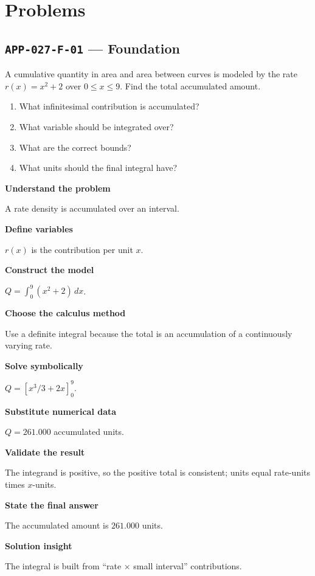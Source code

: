 \documentclass[11pt]{book}
\newcommand{\pid}[1]{\texttt{#1}}
\begin{document}
\section*{Problems}
\subsection*{\pid{APP-027-F-01} — Foundation}
\begin{problembox}
A cumulative quantity in area and area between curves is modeled by the rate $r(x)=x^2+2$ over $0\le x\le 9$. Find the total accumulated amount.
\end{problembox}
\begin{promptbox}\begin{enumerate}
\item What infinitesimal contribution is accumulated?
\item What variable should be integrated over?
\item What are the correct bounds?
\item What units should the final integral have?
\end{enumerate}\end{promptbox}
\begin{solutionbox}
\textbf{Understand the problem}\par A rate density is accumulated over an interval.\par\medskip
\textbf{Define variables}\par $r(x)$ is the contribution per unit $x$.\par\medskip
\textbf{Construct the model}\par $Q=\int_0^{9}(x^2+2)\,dx$.\par\medskip
\textbf{Choose the calculus method}\par Use a definite integral because the total is an accumulation of a continuously varying rate.\par\medskip
\textbf{Solve symbolically}\par $Q=[x^3/3+2x]_0^{9}$.\par\medskip
\textbf{Substitute numerical data}\par $Q=261.000$ accumulated units.\par\medskip
\textbf{Validate the result}\par The integrand is positive, so the positive total is consistent; units equal rate-units times $x$-units.\par\medskip
\textbf{State the final answer}\par The accumulated amount is $261.000$ units.\par\medskip
\textbf{Solution insight}\par The integral is built from “rate × small interval” contributions.\par\medskip
\end{solutionbox}
\end{document}
